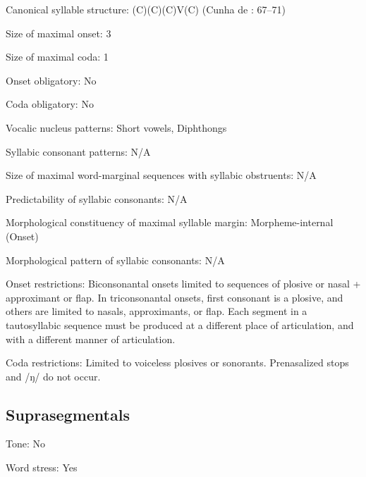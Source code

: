 {\begin{appendixdesc}
\item[Canonical syllable structure:] (C)(C)(C)V(C) (Cunha de \citealt{Oliveira2005}: 67--71)

\item[Size of maximal onset:] 3

\item[Size of maximal coda:] 1

\item[Onset obligatory:] No

\item[Coda obligatory:] No

\item[Vocalic nucleus patterns:] Short vowels, Diphthongs

\item[Syllabic consonant patterns:] N/A

\item[Size of maximal word-marginal sequences with syllabic obstruents:] N/A

\item[Predictability of syllabic consonants:] N/A 

\item[Morphological constituency of maximal syllable margin:] Morpheme-internal (Onset)

\item[Morphological pattern of syllabic consonants:] N/A

\item[Onset restrictions:] Biconsonantal onsets limited to sequences of plosive or nasal + approximant or flap. In triconsonantal onsets, first consonant is a plosive, and others are limited to nasals, approximants, or flap. Each segment in a tautosyllabic sequence must be produced at a different place of articulation, and with a different manner of articulation.

\item[Coda restrictions:] Limited to voiceless plosives or sonorants. Prenasalized stops and /ŋ/ do not occur.
\end{appendixdesc}
\subsection*{Suprasegmentals}
\begin{appendixdesc}

\item[Tone:] No

\item[Word stress:] Yes


\end{appendixdesc}}
